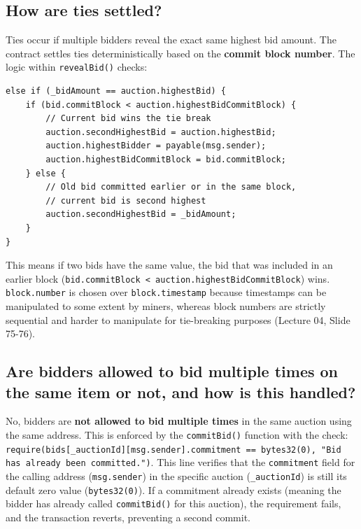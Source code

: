 \documentclass[11pt, a4paper]{article}
\begin{document}
\subsection{How are ties settled?}
Ties occur if multiple bidders reveal the exact same highest bid amount. The contract settles ties deterministically based on the \textbf{commit block number}. The logic within \texttt{revealBid()} checks:
\begin{verbatim}
else if (_bidAmount == auction.highestBid) {
    if (bid.commitBlock < auction.highestBidCommitBlock) {
        // Current bid wins the tie break
        auction.secondHighestBid = auction.highestBid;
        auction.highestBidder = payable(msg.sender);
        auction.highestBidCommitBlock = bid.commitBlock;
    } else {
        // Old bid committed earlier or in the same block, 
        // current bid is second highest
        auction.secondHighestBid = _bidAmount;
    }
}
\end{verbatim}
This means if two bids have the same value, the bid that was included in an earlier block (\texttt{bid.commitBlock < auction.highestBidCommitBlock}) wins. \texttt{block.number} is chosen over \texttt{block.timestamp} because timestamps can be manipulated to some extent by miners, whereas block numbers are strictly sequential and harder to manipulate for tie-breaking purposes (Lecture 04, Slide 75-76).

\subsection{Are bidders allowed to bid multiple times on the same item or not, and how is this handled?}
No, bidders are \textbf{not allowed to bid multiple times} in the same auction using the same address. This is enforced by the \texttt{commitBid()} function with the check:
\texttt{require(bids[\_auctionId][msg.sender].commitment == bytes32(0), "Bid has already been committed.")}.
This line verifies that the \texttt{commitment} field for the calling address (\texttt{msg.sender}) in the specific auction (\texttt{\_auctionId}) is still its default zero value (\texttt{bytes32(0)}). If a commitment already exists (meaning the bidder has already called \texttt{commitBid()} for this auction), the requirement fails, and the transaction reverts, preventing a second commit.
\end{document}
